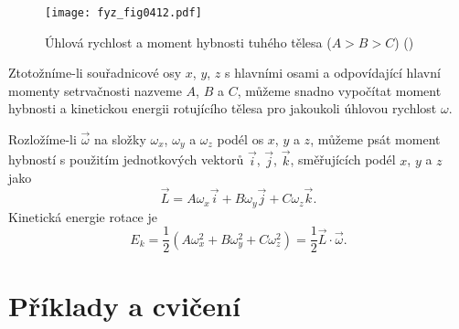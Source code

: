    \begin{figure}[ht!] %
      \centering
      \texttt{[image: fyz\_fig0412.pdf]}
      \caption{Úhlová rychlost a moment hybnosti tuhého tělesa (\(A>B>C\))
              (\cite[s.~283]{Feynman01})}
      \label{fyz:fig0412}
    \end{figure}

    Ztotožníme-li souřadnicové osy \(x\), \(y\), \(z\) s hlavními osami a odpovídající hlavní
    momenty setrvačnosti nazveme \(A\), \(B\) a \(C\), můžeme snadno vypočítat moment hybnosti a
    kinetickou energii rotujícího tělesa pro jakoukoli úhlovou rychlost \(\omega\).

    Rozložíme-li \(\vec{\omega}\) na složky \(ω_x\), \(ω_y\) a \(ω_z\) podél os \(x\), \(y\) a
    \(z\), můžeme psát moment hybností s použitím jednotkových vektorů \(\vec{i}\), \(\vec{j}\),
    \(\vec{k}\), směřujících podél \(x\), \(y\) a \(z\) jako 
    \begin{equation}\label{fyz:eq725}
      \vec{L}=Aω_x\vec{i}+Bω_y\vec{j}+Cω_z\vec{k}.
    \end{equation}
    Kinetická energie rotace je
    \begin{equation}\label{fyz:eq726}
      E_k=\frac{1}{2}(Aω^2_x+Bω^2_y+Cω^2_z) =\frac{1}{2}\vec{L}\cdot\vec{ω}. 
    \end{equation}

  \section{Příklady a cvičení}\label{fyz:IchapXXsecV}  

